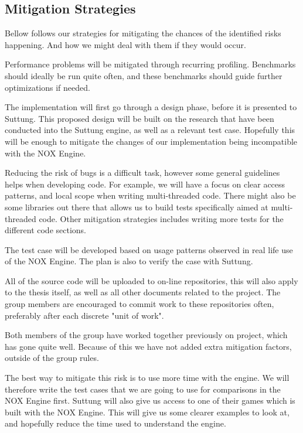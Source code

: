 \subsection{Mitigation Strategies}
Bellow follows our strategies for mitigating the chances of the identified risks happening.
And how we might deal with them if they would occur.

Performance problems will be mitigated through recurring profiling.
Benchmarks should ideally be run quite often,
and these benchmarks should guide further optimizations if needed.

The implementation will first go through a design phase,
before it is presented to Suttung. 
This proposed design will be built on the research
that have been conducted into the Suttung engine,
as well as a relevant test case.
Hopefully this will be enough to mitigate the changes
of our implementation being incompatible with the NOX Engine.

Reducing the risk of bugs is a difficult task, 
however some general guidelines helps when developing code.
For example,
we will have a focus on clear access patterns,
and local scope when writing multi-threaded code.
There might also be some libraries out there that
allows us to build tests specifically aimed at
multi-threaded code.
Other mitigation strategies includes writing more tests for the different code sections.

The test case will be developed based on usage patterns
observed in real life use of the NOX Engine.
The plan is also to verify the case with Suttung.

All of the source code will be uploaded to on-line repositories, 
this will also apply to the thesis itself, as well as
all other documents related to the project.
The group members are encouraged to commit work to these repositories often,
preferably after each discrete "unit of work".

Both members of the group have worked together previously on project,
which has gone quite well. 
Because of this we have not added extra mitigation factors, 
outside of the group rules.

The best way to mitigate this risk is to use more time with the engine.
We will therefore write the test cases that we are
going to use for comparisons in the NOX Engine first.
Suttung will also give us access to one of their games which is built with the NOX Engine.
This will give us some clearer examples to look at, and hopefully reduce the time 
used to understand the engine.

